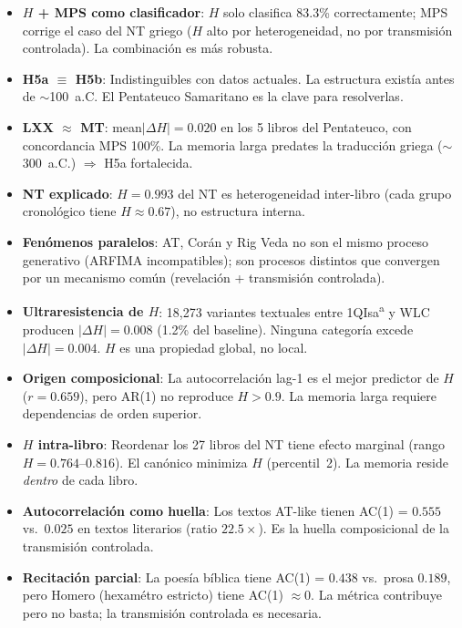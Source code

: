 \documentclass[12pt,a4paper]{article}
\begin{document}
\begin{itemize}[leftmargin=2em]
      La tasa de decaimiento medida es $\sim$0.0008~$H$/siglo (efectivamente cero).
\item \textbf{$H$ + MPS como clasificador}: $H$ solo clasifica 83.3\% correctamente;
      MPS corrige el caso del NT griego ($H$ alto por heterogeneidad, no por
      transmisi\'on controlada). La combinaci\'on es m\'as robusta.
\item \textbf{H5a $\equiv$ H5b}: Indistinguibles con datos actuales.
      La estructura exist\'ia antes de $\sim$100~a.C. El Pentateuco Samaritano
      es la clave para resolverlas.
\item \textbf{LXX $\approx$ MT}: mean$|\Delta H| = 0.020$ en los 5 libros
      del Pentateuco, con concordancia MPS 100\%. La memoria larga predates
      la traducci\'on griega ($\sim$300~a.C.) $\Rightarrow$ H5a fortalecida.
\item \textbf{NT explicado}: $H = 0.993$ del NT es heterogeneidad inter-libro
      (cada grupo cronol\'ogico tiene $H \approx 0.67$), no estructura interna.
\item \textbf{Fen\'omenos paralelos}: AT, Cor\'an y Rig Veda no son el mismo
      proceso generativo (ARFIMA incompatibles); son procesos distintos que
      convergen por un mecanismo com\'un (revelaci\'on + transmisi\'on controlada).
\item \textbf{Ultraresistencia de $H$}: 18,273 variantes textuales entre
      1QIsa\textsuperscript{a} y WLC producen $|\Delta H| = 0.008$ (1.2\% del
      baseline). Ninguna categor\'ia excede $|\Delta H| = 0.004$.
      $H$ es una propiedad global, no local.
\item \textbf{Origen composicional}: La autocorrelaci\'on lag-1 es el mejor
      predictor de $H$ ($r = 0.659$), pero AR(1) no reproduce $H > 0.9$.
      La memoria larga requiere dependencias de orden superior.
\item \textbf{$H$ intra-libro}: Reordenar los 27 libros del NT tiene efecto
      marginal (rango $H = 0.764$--$0.816$). El can\'onico minimiza $H$
      (percentil~2). La memoria reside \emph{dentro} de cada libro.
\item \textbf{Autocorrelaci\'on como huella}: Los textos AT-like tienen
      AC(1) = $0.555$ vs.\ $0.025$ en textos literarios (ratio $22.5\times$).
      Es la huella composicional de la transmisi\'on controlada.
\item \textbf{Recitaci\'on parcial}: La poes\'ia b\'iblica tiene AC(1) = $0.438$
      vs.\ prosa $0.189$, pero Homero (hexam\'etro estricto) tiene AC(1) $\approx 0$.
      La m\'etrica contribuye pero no basta; la transmisi\'on controlada es necesaria.

\end{itemize}
\end{document}
